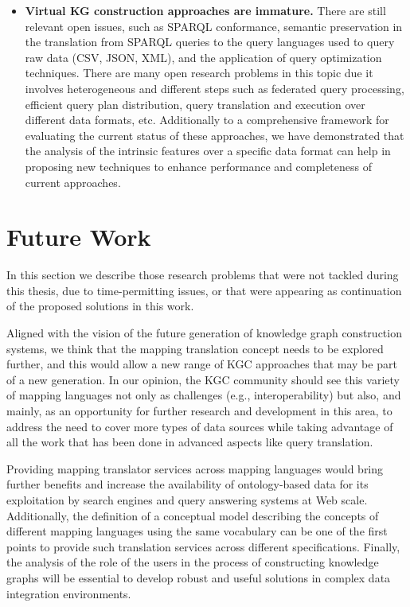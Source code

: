 \begin{itemize}
    \item \textbf{Virtual KG construction approaches are immature.} There are still relevant open issues, such as SPARQL conformance, semantic preservation in the translation from SPARQL queries to the query languages used to query raw data (CSV, JSON, XML), and the application of query optimization techniques. There are many open research problems in this topic due it involves heterogeneous and different steps such as federated query processing, efficient query plan distribution, query translation and execution over different data formats, etc. Additionally to a comprehensive framework for evaluating the current status of these approaches, we have demonstrated that the analysis of the intrinsic features over a specific data format can help in proposing new techniques to enhance performance and completeness of current approaches. 
\end{itemize}


\section{Future Work}
In this section we describe those research problems that were not tackled during this thesis, due to time-permitting issues, or that were appearing as continuation of the proposed solutions in this work.

Aligned with the vision of the future generation of knowledge graph construction systems, we think that the mapping translation concept needs to be explored further, and this would allow a new range of KGC approaches that may be part of a new generation. In our opinion, the KGC community should see this variety of mapping languages not only as challenges (e.g., interoperability) but also, and mainly, as an opportunity for further research and development in this area, to address the need to cover more types of data sources while taking advantage of all the work that has been done in advanced aspects like query translation. 

Providing mapping translator services across mapping languages would bring further benefits and increase the availability of ontology-based data for its exploitation by search engines and query answering systems at Web scale. Additionally, the definition of a conceptual model describing the concepts of different mapping languages using the same vocabulary can be one of the first points to provide such translation services across different specifications. Finally, the analysis of the role of the users in the process of constructing knowledge graphs will be essential to develop robust and useful solutions in complex data integration environments.

